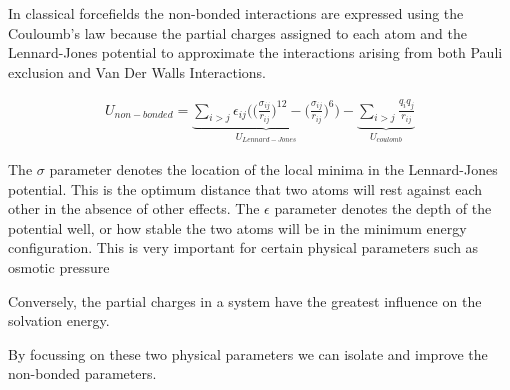 In classical forcefields the non-bonded interactions are expressed using the Couloumb's law because the partial charges assigned to each atom and the Lennard-Jones potential to approximate the interactions arising from both Pauli exclusion and Van Der Walls Interactions.

\begin{equation}\label{nonbonded_eqs}
	\begin{aligned}
		U_{non-bonded} = \underbrace{\sum_{i>j} \epsilon_{ij} \Big( \Big(\frac{\sigma_{ij}}{r_{ij}}\Big)^{12} - \Big(\frac{\sigma_{ij}}{r_{ij}}\Big)^{6} \Big)}_{U_{Lennard-Jones}} - \underbrace{\sum_{i>j} \frac{q_i q_j } {r_{ij}}}_{U_{coulomb}}
	\end{aligned}
\end{equation}


The $\sigma$ parameter denotes the location of the local minima in the Lennard-Jones potential. This is the optimum distance that two atoms will rest against each other in the absence of other effects. The $\epsilon$ parameter denotes the depth of the potential well, or how stable the two atoms will be in the minimum energy configuration. This is very important for certain physical parameters such as osmotic pressure  \cite{yoo2018a}

Conversely, the partial charges in a system have the greatest influence on the solvation energy.

By focussing on these two physical parameters we can isolate and improve the non-bonded parameters.

